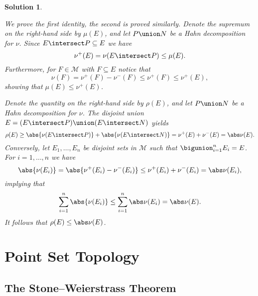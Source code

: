 \documentclass[article, a4paper, 11pt, oneside]{memoir}
\numberwithin{equation}{chapter}
\newcommand{\calM}{\mathcal{M}}
\theoremstyle{nonumberplain}
\newtheorem{solution}{Solution}
\begin{document}
\begin{solution}
\begin{solutionsec}
	\item We prove the first identity, the second is proved similarly. Denote the supremum on the right-hand side by $\mu(E)$, and let $P \union N$ be a Hahn decomposition for $\nu$. Since $E \intersect P \subseteq E$ we have
	\begin{equation*}
		\nu^+(E)
			= \nu(E \intersect P)
			\leq \mu(E).
	\end{equation*}
	Furthermore, for $F \in \calM$ with $F \subseteq E$ notice that
	\begin{equation*}
		\nu(F)
			= \nu^+(F) - \nu^-(F)
			\leq \nu^+(F)
			\leq \nu^+(E),
	\end{equation*}
	showing that $\mu(E) \leq \nu^+(E)$.

	\item Denote the quantity on the right-hand side by $\rho(E)$, and let $P \union N$ be a Hahn decomposition for $\nu$. The disjoint union $E = (E \intersect P) \union (E \intersect N)$ yields
	\begin{equation*}
		\rho(E)
			\geq \abs{\nu(E \intersect P)} + \abs{\nu(E \intersect N)}
			= \nu^+(E) + \nu^-(E)
			= \abs\nu(E). 
	\end{equation*}
	Conversely, let $E_1, \ldots, E_n$ be disjoint sets in $\calM$ such that $\bigunion_{i=1}^n E_i = E$. For $i = 1, \ldots, n$ we have
	\begin{equation*}
		\abs{\nu(E_i)}
			= \abs{ \nu^+(E_i) - \nu^-(E_i) }
			\leq \nu^+(E_i) + \nu^-(E_i)
			= \abs\nu(E_i),
	\end{equation*}
	implying that
	\begin{equation*}
		\sum_{i=1}^n \abs{\nu(E_i)}
			\leq \sum_{i=1}^n \abs\nu(E_i)
			= \abs\nu(E).
	\end{equation*}
	It follows that $\rho(E) \leq \abs\nu(E)$.
\end{solutionsec}
\end{solution}


\chapter{Point Set Topology}

\setcounter{section}{6}
\section{The Stone--Weierstrass Theorem}
\end{document}
